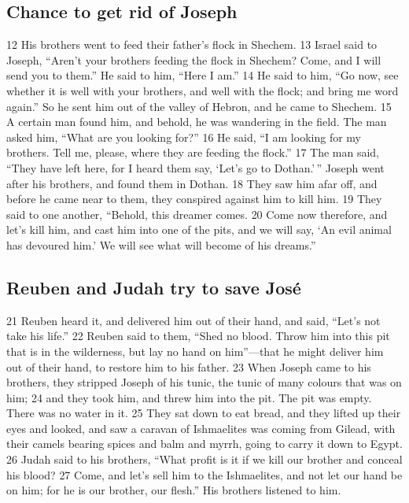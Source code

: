\hypertarget{chance-to-get-rid-of-joseph}{%
\subsection{Chance to get rid of
Joseph}\label{chance-to-get-rid-of-joseph}}

{12} His brothers went to feed their father's flock in Shechem. {13}
Israel said to Joseph, ``Aren't your brothers feeding the flock in
Shechem? Come, and I will send you to them.'' He said to him, ``Here I
am.'' {14} He said to him, ``Go now, see whether it is well with your
brothers, and well with the flock; and bring me word again.'' So he sent
him out of the valley of Hebron, and he came to Shechem. {15} A certain
man found him, and behold, he was wandering in the field. The man asked
him, ``What are you looking for?'' {16} He said, ``I am looking for my
brothers. Tell me, please, where they are feeding the flock.'' {17} The
man said, ``They have left here, for I heard them say, `Let's go to
Dothan.'\,'' Joseph went after his brothers, and found them in Dothan.
{18} They saw him afar off, and before he came near to them, they
conspired against him to kill him. {19} They said to one another,
``Behold, this dreamer comes. {20} Come now therefore, and let's kill
him, and cast him into one of the pits, and we will say, `An evil animal
has devoured him.' We will see what will become of his dreams.''

\hypertarget{reuben-and-judah-try-to-save-josuxe9}{%
\subsection{Reuben and Judah try to save
José}\label{reuben-and-judah-try-to-save-josuxe9}}

{21} Reuben heard it, and delivered him out of their hand, and said,
``Let's not take his life.'' {22} Reuben said to them, ``Shed no blood.
Throw him into this pit that is in the wilderness, but lay no hand on
him''---that he might deliver him out of their hand, to restore him to
his father. {23} When Joseph came to his brothers, they stripped Joseph
of his tunic, the tunic of many colours that was on him; {24} and they
took him, and threw him into the pit. The pit was empty. There was no
water in it. {25} They sat down to eat bread, and they lifted up their
eyes and looked, and saw a caravan of Ishmaelites was coming from
Gilead, with their camels bearing spices and balm and myrrh, going to
carry it down to Egypt. {26} Judah said to his brothers, ``What profit
is it if we kill our brother and conceal his blood? {27} Come, and let's
sell him to the Ishmaelites, and not let our hand be on him; for he is
our brother, our flesh.'' His brothers listened to him.


